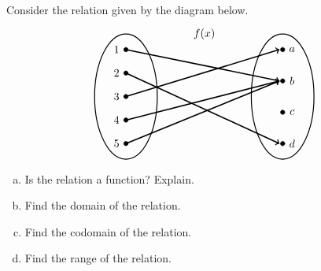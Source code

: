 \documentclass[12pt,letterpaper]{exam}
\begin{document}
\examtitle
{} 
\scores
\bottomline
\newpage


\begin{questions}

\newpage
\question[10] Consider the relation given by the diagram below.
	\[
	\begin{tikzpicture}
	\node at (2.5,2) {$f(x)$};
	
	\draw[line width=0.03cm] (0,0) circle (1 and 2);
	\draw[line width=0.03cm] (5,0) circle (1 and 2);
	
	\draw[fill=black] (0,1.5) circle (0.07);
	\draw[fill=black] (0,0.75) circle (0.07);
	\draw[fill=black] (0,0) circle (0.07);
	\draw[fill=black] (0,-0.75) circle (0.07);
	\draw[fill=black] (0,-1.5) circle (0.07);
	
	\draw[fill=black] (5,1.5) circle (0.07);
	\draw[fill=black] (5,0.50) circle (0.07);
	\draw[fill=black] (5,-0.5) circle (0.07);
	\draw[fill=black] (5,-1.5) circle (0.07);
	
	\draw[line width=0.04cm,->] (0,1.5) -- (4.9,0.50);
	\draw[line width=0.04cm,->] (0,0.75) -- (4.9,-1.5);
	\draw[line width=0.04cm,->] (0,0) -- (4.9,1.5);
	\draw[line width=0.04cm,->] (0,-1.5) -- (4.9,0.5);
	\draw[line width= 0.04cm,->,black] (0,-0.75) -- (4.9,0.5);
	
	\node at (-0.3,1.5) {$1$};
	\node at (-0.3,0.75) {$2$};
	\node at (-0.3,0) {$3$};
	\node at (-0.3,-0.75) {$4$};
	\node at (-0.3,-1.5) {$5$};
	
	\node at (5.3,1.5) {$a$};
	\node at (5.3,0.5) {$b$};
	\node at (5.3,-0.5) {$c$};
	\node at (5.3,-1.5) {$d$};
	\end{tikzpicture}
	\]

\begin{enumerate}[(a)]
\item Is the relation a function? Explain. 
\item Find the domain of the relation.
\item Find the codomain of the relation.
\item Find the range of the relation. 
\end{enumerate} \pspace


\end{questions}
\end{document}
